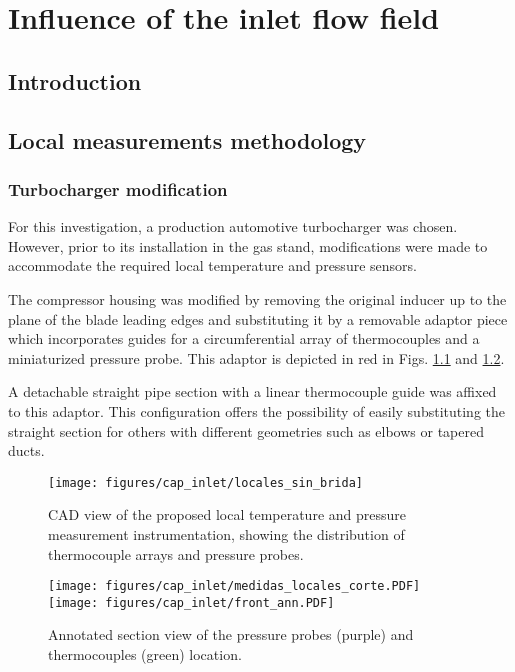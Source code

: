 \chapter{Influence of the inlet flow field}
\label{cap:inlet}

\section{Introduction}

\section{Local measurements methodology}

\subsection{Turbocharger modification}
For this investigation, a production automotive turbocharger was chosen. However, prior to its installation in the gas stand, modifications were made to accommodate the required local temperature and pressure sensors.

The compressor housing was modified by removing the original inducer up to the plane of the blade leading edges and substituting it by a removable adaptor piece which incorporates guides for a circumferential array of thermocouples and a miniaturized pressure probe. This adaptor is depicted in red in Figs. \ref{fig:metod_local_meas} and \ref{fig:metod_local_meas_dimen}.

A detachable straight pipe section with a linear thermocouple guide was affixed to this adaptor. This configuration offers the possibility of easily substituting the straight section for others with different geometries such as elbows or tapered ducts.

\begin{figure}[htb!]
\centering
\texttt{[image: figures/cap\_inlet/locales\_sin\_brida]}
\caption{CAD view of the proposed local temperature and pressure measurement instrumentation, showing the distribution of thermocouple arrays and pressure probes.}
\label{fig:metod_local_meas}
\end{figure}

\begin{figure}[b!]
\centering
\texttt{[image: figures/cap\_inlet/medidas\_locales\_corte.PDF]}
\texttt{[image: figures/cap\_inlet/front\_ann.PDF]}
\caption{Annotated section view of the pressure probes (purple) and thermocouples (green) location.}
\label{fig:metod_local_meas_dimen}
\end{figure}


